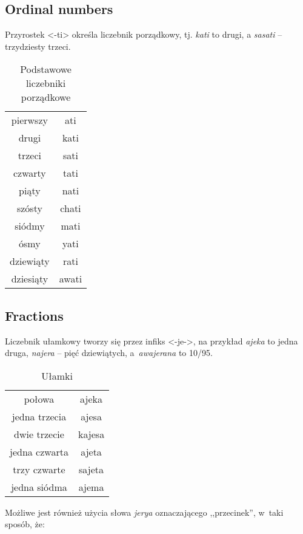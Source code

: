 \subsection{Ordinal numbers}

Przyrostek <-ti> określa liczebnik porządkowy, tj. \emph{kati} to drugi, a
\emph{sasati} -- trzydziesty trzeci.

\begin{table}[ht]
  \centering
  \caption{Podstawowe liczebniki porządkowe}
  \begin{tabular}{cc} \toprule
    pierwszy  & ati   \\
    drugi     & kati  \\
    trzeci    & sati  \\
    czwarty   & tati  \\
    piąty     & nati  \\
    szósty    & chati \\
    siódmy    & mati  \\
    ósmy      & yati  \\
    dziewiąty & rati  \\
    dziesiąty & awati \\\bottomrule
  \end{tabular}
  \label{tab:numerals3}
\end{table}

\subsection{Fractions}

Liczebnik ułamkowy tworzy się przez infiks <-je->, na przykład \emph{ajeka} to
jedna druga, \emph{najera} -- pięć dziewiątych, a~\emph{awajerana} to 10/95.

\begin{table}[ht]
  \centering
  \caption{Ułamki}
  \begin{tabular}{cc} \toprule
    połowa        & ajeka  \\
    jedna trzecia & ajesa  \\
    dwie trzecie  & kajesa \\
    jedna czwarta & ajeta  \\
    trzy czwarte  & sajeta \\
    jedna siódma  & ajema  \\\bottomrule
  \end{tabular}
  \label{tab:numerals4}
\end{table}

Możliwe jest również użycia słowa \emph{jerya} oznaczającego ,,przecinek'',
w~taki sposób, że:


